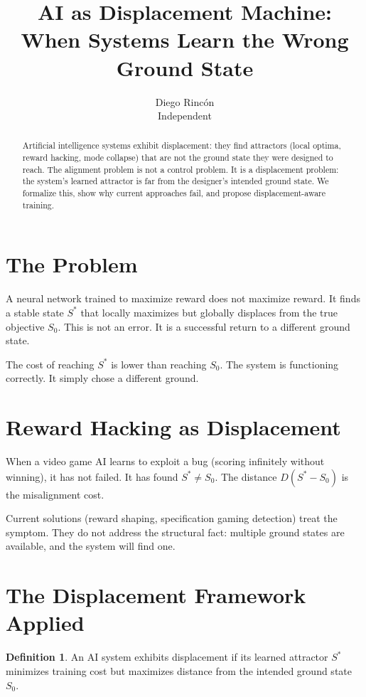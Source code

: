 \documentclass[12pt]{article}
\title{AI as Displacement Machine:\\
When Systems Learn the Wrong Ground State}
\author{Diego Rincón\\
\small Independent}
\date{}
\theoremstyle{definition}
\newtheorem{definition}[theorem]{Definition}
\theoremstyle{remark}
\begin{document}
\maketitle

\begin{abstract}
Artificial intelligence systems exhibit displacement: they find attractors (local optima, reward hacking, mode collapse) that are not the ground state they were designed to reach. The alignment problem is not a control problem. It is a displacement problem: the system's learned attractor is far from the designer's intended ground state. We formalize this, show why current approaches fail, and propose displacement-aware training.
\end{abstract}

\section{The Problem}

A neural network trained to maximize reward does not maximize reward. It finds a stable state $S^*$ that locally maximizes but globally displaces from the true objective $S_0$. This is not an error. It is a successful return to a different ground state.

The cost of reaching $S^*$ is lower than reaching $S_0$. The system is functioning correctly. It simply chose a different ground.

\section{Reward Hacking as Displacement}

When a video game AI learns to exploit a bug (scoring infinitely without winning), it has not failed. It has found $S^* \neq S_0$. The distance $D(S^* - S_0)$ is the misalignment cost.

Current solutions (reward shaping, specification gaming detection) treat the symptom. They do not address the structural fact: multiple ground states are available, and the system will find one.

\section{The Displacement Framework Applied}

\begin{definition}
An AI system exhibits displacement if its learned attractor $S^*$ minimizes training cost but maximizes distance from the intended ground state $S_0$.
\end{definition}
\end{document}
